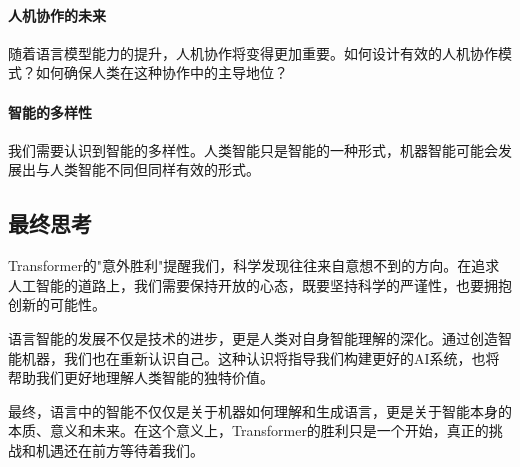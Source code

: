 \paragraph{人机协作的未来}
随着语言模型能力的提升，人机协作将变得更加重要。如何设计有效的人机协作模式？如何确保人类在这种协作中的主导地位？

\paragraph{智能的多样性}
我们需要认识到智能的多样性。人类智能只是智能的一种形式，机器智能可能会发展出与人类智能不同但同样有效的形式。

\subsection{最终思考}

Transformer的"意外胜利"提醒我们，科学发现往往来自意想不到的方向。在追求人工智能的道路上，我们需要保持开放的心态，既要坚持科学的严谨性，也要拥抱创新的可能性。

语言智能的发展不仅是技术的进步，更是人类对自身智能理解的深化。通过创造智能机器，我们也在重新认识自己。这种认识将指导我们构建更好的AI系统，也将帮助我们更好地理解人类智能的独特价值。

最终，语言中的智能不仅仅是关于机器如何理解和生成语言，更是关于智能本身的本质、意义和未来。在这个意义上，Transformer的胜利只是一个开始，真正的挑战和机遇还在前方等待着我们。